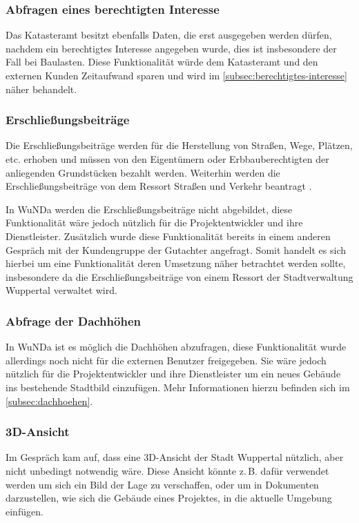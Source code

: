  
\subsubsection{Abfragen eines berechtigten Interesse}
Das Katasteramt besitzt ebenfalls Daten, die erst ausgegeben werden dürfen, nachdem ein berechtigtes Interesse angegeben wurde, dies ist insbesondere der Fall bei Baulasten.
Diese Funktionalität würde dem Katasteramt und den externen Kunden Zeitaufwand sparen und wird im \autoref{subsec:berechtigtes-interesse} näher behandelt.

\subsubsection{Erschließungsbeiträge}
Die Erschließungsbeiträge werden für die Herstellung von Straßen, Wege, Plätzen, etc. erhoben und müssen von den Eigentümern oder Erbbauberechtigten der anliegenden Grundstücken bezahlt werden.
Weiterhin werden die Erschließungsbeiträge von dem Ressort Straßen und Verkehr beantragt \autocite[vgl.][]{wupp-erschliessungsbeitrag}.

In \ac{WuNDa} werden die Erschließungsbeiträge nicht abgebildet, diese Funktionalität wäre jedoch nützlich für die Projektentwickler und ihre Dienstleister.
Zusätzlich wurde diese Funktionalität bereits in einem anderen Gespräch mit der Kundengruppe der Gutachter angefragt.
Somit handelt es sich hierbei um eine Funktionalität deren Umsetzung näher betrachtet werden sollte, insbesondere da die Erschließungsbeiträge von einem Ressort der Stadtverwaltung Wuppertal verwaltet wird.

\subsubsection{Abfrage der Dachhöhen}
In \ac{WuNDa} ist es möglich die Dachhöhen abzufragen, diese Funktionalität wurde allerdings noch nicht für die externen Benutzer freigegeben.
Sie wäre jedoch nützlich für die Projektentwickler und ihre Dienstleister um ein neues Gebäude ins bestehende Stadtbild einzufügen.
Mehr Informationen hierzu befinden sich im \autoref{subsec:dachhoehen}.

\subsubsection{3D-Ansicht}
Im Gespräch kam auf, dass eine 3D-Ansicht der Stadt Wuppertal nützlich, aber nicht unbedingt notwendig wäre.
Diese Ansicht könnte z.\,B. dafür verwendet werden um sich ein Bild der Lage zu verschaffen, oder um in Dokumenten darzustellen, wie sich die Gebäude eines Projektes, in die aktuelle Umgebung einfügen.

